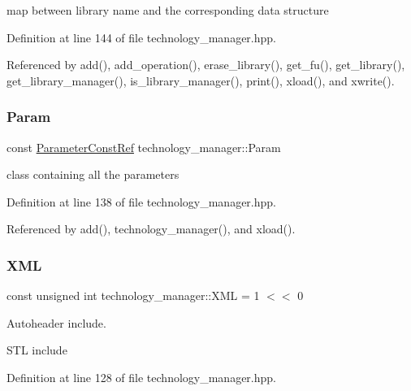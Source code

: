 map between library name and the corresponding data structure 



Definition at line 144 of file technology\+\_\+manager.\+hpp.



Referenced by add(), add\+\_\+operation(), erase\+\_\+library(), get\+\_\+fu(), get\+\_\+library(), get\+\_\+library\+\_\+manager(), is\+\_\+library\+\_\+manager(), print(), xload(), and xwrite().

\mbox{\label{classtechnology__manager_a47edc9b47d477c53cde3442aa27dab05}} 
\subsubsection{\texorpdfstring{Param}{Param}}
{\footnotesize\ttfamily const \hyperlink{Parameter_8hpp_a37841774a6fcb479b597fdf8955eb4ea}{Parameter\+Const\+Ref} technology\+\_\+manager\+::\+Param\hspace{0.3cm}{\ttfamily [private]}}



class containing all the parameters 



Definition at line 138 of file technology\+\_\+manager.\+hpp.



Referenced by add(), technology\+\_\+manager(), and xload().

\mbox{\label{classtechnology__manager_a8f97d158b7359918f01d1d7407710b53}} 
\subsubsection{\texorpdfstring{X\+ML}{XML}}
{\footnotesize\ttfamily const unsigned int technology\+\_\+manager\+::\+X\+ML = 1 $<$$<$ 0\hspace{0.3cm}{\ttfamily [static]}}



Autoheader include. 

S\+TL include 

Definition at line 128 of file technology\+\_\+manager.\+hpp.



